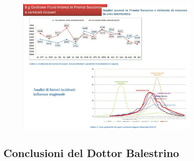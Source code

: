  \begin{figure}[!ht]
\centering
	\includegraphics[width=0.8\textwidth]{32/image26.jpeg}
	\end{figure}

\subsection{Conclusioni del Dottor Balestrino}

